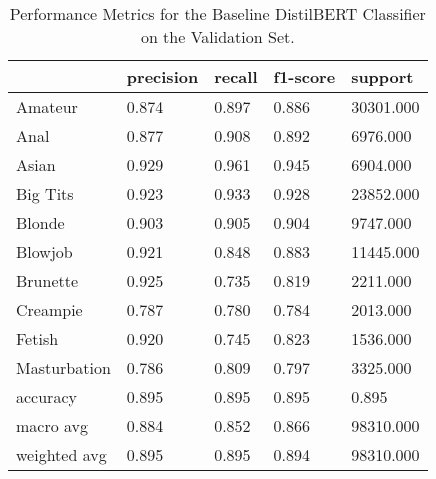 \begin{table}[htbp]
\centering
\caption{Performance Metrics for the Baseline DistilBERT Classifier on the Validation Set.}
\label{tab:bert-baseline-metrics}
\begin{tabular}{lllll}
\toprule
 & precision & recall & f1-score & support \\
\midrule
Amateur & 0.874 & 0.897 & 0.886 & 30301.000 \\
Anal & 0.877 & 0.908 & 0.892 & 6976.000 \\
Asian & 0.929 & 0.961 & 0.945 & 6904.000 \\
Big Tits & 0.923 & 0.933 & 0.928 & 23852.000 \\
Blonde & 0.903 & 0.905 & 0.904 & 9747.000 \\
Blowjob & 0.921 & 0.848 & 0.883 & 11445.000 \\
Brunette & 0.925 & 0.735 & 0.819 & 2211.000 \\
Creampie & 0.787 & 0.780 & 0.784 & 2013.000 \\
Fetish & 0.920 & 0.745 & 0.823 & 1536.000 \\
Masturbation & 0.786 & 0.809 & 0.797 & 3325.000 \\
accuracy & 0.895 & 0.895 & 0.895 & 0.895 \\
macro avg & 0.884 & 0.852 & 0.866 & 98310.000 \\
weighted avg & 0.895 & 0.895 & 0.894 & 98310.000 \\
\bottomrule
\end{tabular}

\end{table}
